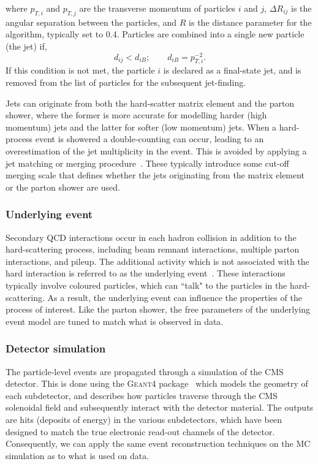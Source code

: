 \noindent
where $p_{T,i}$ and $p_{T,j}$ are the transverse momentum of particles $i$ and $j$, $\Delta R_{ij}$ is the angular separation between the particles, and $R$ is the distance parameter for the algorithm, typically set to 0.4. Particles are combined into a single new particle (the jet) if,
\begin{equation}
    d_{ij} < d_{iB}; \qquad d_{iB} = p^{-2}_{T,i}.
\end{equation}
\noindent
If this condition is not met, the particle $i$ is declared as a final-state jet, and is removed from the list of particles for the subsequent jet-finding.

Jets can originate from both the hard-scatter matrix element and the parton shower, where the former is more accurate for modelling harder (high momentum) jets and the latter for softer (low momentum) jets. When a hard-process event is showered a double-counting can occur, leading to an overestimation of the jet multiplicity in the event. This is avoided by applying a jet matching or merging procedure~\cite{Alwall:2007fs}. These typically introduce some cut-off merging scale that defines whether the jets originating from the matrix element or the parton shower are used.

\subsubsection{Underlying event}
Secondary QCD interactions occur in each hadron collision in addition to the hard-scattering process, including beam remnant interactions, multiple parton interactions, and pileup. The additional activity which is not associated with the hard interaction is referred to as the underlying event~\cite{Buckley:2011ms}. These interactions typically involve coloured particles, which can ``talk" to the particles in the hard-scattering. As a result, the underlying event can influence the properties of the process of interest. Like the parton shower, the free parameters of the underlying event model are tuned to match what is observed in data. 

\subsubsection{Detector simulation}
The particle-level events are propagated through a simulation of the CMS detector. This is done using the \textsc{Geant4} package~\cite{Agostinelli:2002hh} which models the geometry of each subdetector, and describes how particles traverse through the CMS solenoidal field and subsequently interact with the detector material. The outputs are hits (deposits of energy) in the various subdetectors, which have been designed to match the true electronic read-out channels of the detector. Consequently, we can apply the same event reconstruction techniques on the MC simulation as to what is used on data. 

